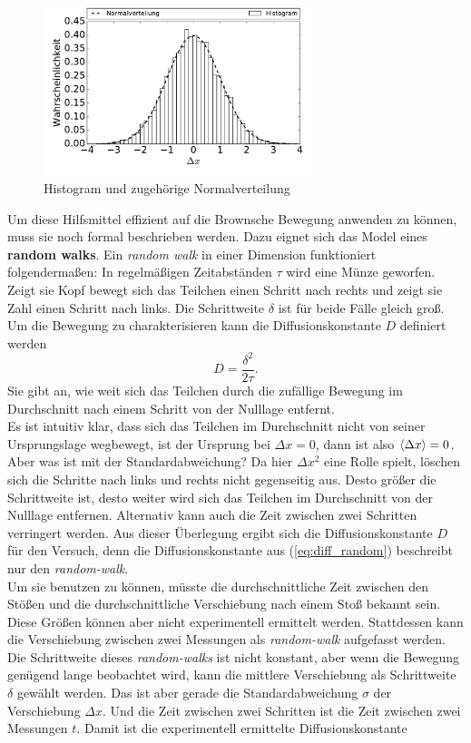 \begin{figure}[h!]
  \centering
  \includegraphics[width=0.7\textwidth]{figures/histogram}
  \caption{Histogram und zugehörige Normalverteilung}\label{fig:histo}
\end{figure}
Um diese Hilfsmittel effizient auf die Brownsche Bewegung anwenden zu können, muss sie noch formal beschrieben werden. Dazu eignet sich das Model eines \textbf{random walks}. Ein \emph{random walk} in einer Dimension funktioniert folgendermaßen: In regelmäßigen Zeitabständen $\tau$ wird eine Münze geworfen. Zeigt sie Kopf bewegt sich das Teilchen einen Schritt nach rechts und zeigt sie Zahl einen Schritt nach links. Die Schrittweite $\delta$ ist für beide Fälle gleich groß. Um die Bewegung zu charakterisieren kann die Diffusionskonstante $D$ definiert werden
\begin{equation}
  D = \frac{\delta^2}{2 \tau}. \label{eq:diff_random}
\end{equation}
Sie gibt an, wie weit sich das Teilchen durch die zufällige Bewegung im Durchschnitt nach einem Schritt von der Nulllage entfernt.\\
Es ist intuitiv klar, dass sich das Teilchen im Durchschnitt nicht von seiner Ursprungslage wegbewegt, ist der Ursprung bei $\Delta x = 0$, dann ist also $\left< \Delta x \right> = 0$. Aber was ist mit der Standardabweichung? Da hier $\Delta x^2$ eine Rolle spielt, löschen sich die Schritte nach links und rechts nicht gegenseitig aus.
Desto größer die Schrittweite ist, desto weiter wird sich das Teilchen im Durchschnitt von der Nulllage entfernen. Alternativ kann auch die Zeit zwischen zwei Schritten verringert werden. Aus dieser Überlegung ergibt sich die Diffusionskonstante $D$ für den Versuch, denn die Diffusionskonstante aus (\ref{eq:diff_random}) beschreibt nur den \emph{random-walk}.\\
Um sie benutzen zu können, müsste die durchschnittliche Zeit zwischen den Stößen und die durchschnittliche Verschiebung nach einem Stoß bekannt sein. Diese Größen können aber nicht experimentell ermittelt werden. Stattdessen kann die Verschiebung zwischen zwei Messungen als \emph{random-walk} aufgefasst werden. Die Schrittweite dieses \emph{random-walks} ist nicht konstant, aber wenn die Bewegung genügend lange beobachtet wird, kann die mittlere Verschiebung als Schrittweite $\delta$ gewählt werden. Das ist aber gerade die Standardabweichung $\sigma$ der Verschiebung $\Delta x$. Und die Zeit zwischen zwei Schritten ist die Zeit zwischen zwei Messungen $t$. Damit ist die experimentell ermittelte Diffusionskonstante
